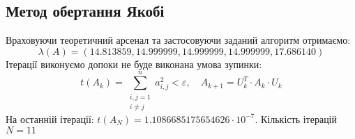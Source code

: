 \documentclass[12pt, a4paper]{article}
\theoremstyle{definition}
\newcommand{\Sum}{\displaystyle\sum\limits}
\renewcommand{\epsilon}{\varepsilon}
\numberwithin{equation}{section}
\begin{document}
\subsection{Метод обертання Якобі}

Враховуючи теоретичний арсенал та застосовуючи заданий алгоритм отримаємо: \[ \lambda(A) = (14.813859, 14.999999, 14.999999, 14.999999, 17.686140)\]
Ітерації виконуємо допоки не буде виконана умова зупинки: \[t(A_k) = \Sum_{\substack{i,j = 1\\i\ne j}}^n a_{i,j}^2 < \epsilon, \quad A_{k+1} = U_k^T \cdot A_k \cdot U_k \]
На останній ітерації: $t(A_N) = 1.1086685175654626\cdot10^{-7}$. Кількість ітерацій $N = 11$
\end{document}
